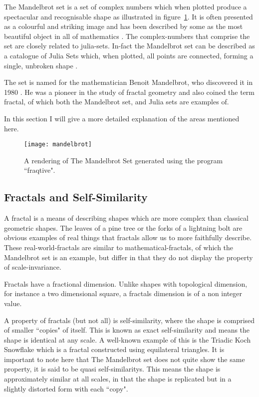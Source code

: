 The Mandelbrot set is a set of complex numbers which when plotted produce a spectacular and recognisable shape as illustrated in figure~\ref{fig:mandelimg}.
It is often presented as a colourful and striking image and has been described by some as the most beautiful object in all of mathematics \cite[p.~234]{chaosfract}.
The \glspl{complex-number} that comprise the set are closely related to \glspl{julia-set}. 
In-fact the Mandelbrot set can be described as a catalogue of Julia Sets which, when plotted, all points are connected, 
forming a single, unbroken shape \cite[p.~177]{fractimg}.

The set is named for the mathematician Benoit Mandelbrot, who discovered it in 1980 \cite{fracnature , fractimg}. He was a pioneer in the study of 
fractal geometry and also coined the term \gls{fractal}, of which both the Mandelbrot set, and Julia sets are examples of. 

In this section I will give a more detailed explanation of the areas mentioned here. 

\begin{figure}[h]
  \caption{A rendering of The Mandelbrot Set generated using the program ``fraqtive"\cite{fraqtive}.}
  \label{fig:mandelimg}
  \centering
    \texttt{[image: mandelbrot]}
\end{figure}

\subsection*{Fractals and Self-Similarity} 
A \gls{fractal} is a means of describing shapes which are more complex than classical geometric shapes. The leaves of a pine tree or the forks of a 
lightning bolt are obvious examples of real things that fractals allow us to more faithfully describe. 
These \glspl{real-world-fractal} are similar to \glspl{mathematical-fractal}, 
of which the Mandelbrot set is an example, but differ in that they do not display the property of \gls{scale-invariance}. 

Fractals have a fractional dimension. Unlike shapes with topological dimension, for instance a two dimensional square, 
a \glspl{fractal} dimension is of a non integer value.

A property of fractals (but not all) is \gls{self-similarity}, where the shape is comprised of smaller ``copies" of itself. 
This is known as \gls{exact self-similarity} and means the shape is identical at any scale.
A well-known example of this is the Triadic Koch Snowflake which is a fractal constructed using equilateral triangles. 
It is important to note here that The Mandelbrot set does not quite show the same property, it is said to be 
\glspl{quasi self-similarity}. This means the shape is approximately similar at all scales, in that the shape is replicated but in a slightly distorted
form with each ``copy".

